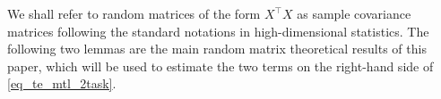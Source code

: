 
We shall refer to random matrices of the form $X^\top X$ as sample covariance matrices following the standard notations in high-dimensional statistics. The following two lemmas  are the main random matrix theoretical results of this paper, which will be used to estimate the two terms on the right-hand side of \eqref{eq_te_mtl_2task}.

